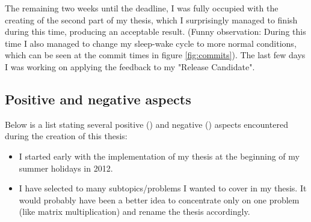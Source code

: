 The remaining two weeks until the deadline, I was fully occupied with the creating of the second part of my thesis, which I surprisingly managed to finish during this time, producing an acceptable result. (Funny observation: During this time I also managed to change my sleep-wake cycle to more normal conditions, which can be seen at the commit times in figure \ref{fig:commits}). The last few days I was working on applying the feedback to my "Release Candidate".


\subsection{Positive and negative aspects}

Below is a list stating several positive () and negative () aspects encountered during the creation of this thesis:

\begin{itemize}
	 \item[\ding{51}] I started early with the implementation of my thesis at the beginning of my summer holidays in 2012.
	 \item[\ding{55}] I have selected to many subtopics/problems I wanted to cover in my thesis. It would probably have been a better idea to concentrate only on one problem (like matrix multiplication) and rename the thesis accordingly.
	
\end{itemize}













